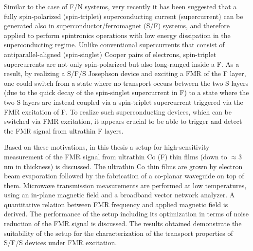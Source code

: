 Similar to the case of F/N systems, very recently it has been suggested that a fully spin-polarized (spin-triplet) superconducting current (supercurrent) can be generated also in superconductor/ferromagnet (S/F) systems, and therefore applied to perform spintronics operations with low energy dissipation in the superconducting regime.	Unlike conventional supercurrents that consist of antiparallel-aligned (spin-singlet) Cooper pairs of electrons, spin-triplet supercurrents are not only spin-polarized but also long-ranged inside a F. As a result, by realizing a S/F/S Josephson device and exciting a FMR of the F layer, one could switch from a state where no transport occurs between the two S layers (due to the quick decay of the spin-singlet supercurrent in F) to a state where the two S layers are instead coupled via a spin-triplet supercurrent triggered via the FMR excitation of F. To realize such superconducting devices, which can be switched via FMR excitation, it appears crucial to be able to trigger and detect the FMR signal from ultrathin F layers.

Based on these motivations, in this thesis a setup for high-sensitivity measurement of the FMR signal from ultrathin Co (F) thin films (down to $\approx3\,$nm in thickness) is discussed. The ultrathin Co thin films are grown by electron beam evaporation followed by the fabrication of a co-planar waveguide on top of them. Microwave transmission measurements are performed at low temperatures, using an in-plane magnetic field and a broadband vector network analyzer. A quantitative relation between FMR frequency and applied magnetic field is derived. The performance of the setup including its optimization in terms of noise reduction of the FMR signal is discussed. The results obtained demonstrate the suitability of the setup for the characterization of the transport properties of S/F/S devices under FMR excitation.

